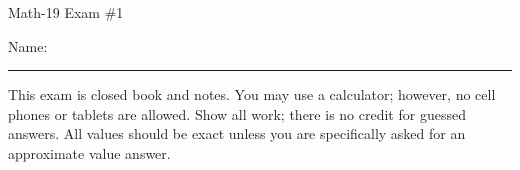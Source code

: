 \documentclass[letterpaper,12pt,fleqn]{article}
\begin{document}
\begin{center}
\Large Math-19 Exam \#1
\end{center}

\vspace{0.5in}

Name: \rule{4in}{1pt}

\vspace{0.5in}

This exam is closed book and notes. You may use a calculator; however, no cell
phones or tablets are allowed. Show all work; there is no credit for guessed
answers. All values should be exact unless you are specifically asked for an
approximate value answer.

\vspace{0.5in}

\newcommand{\fillin}{\rule{2in}{1pt}}
\newcommand{\sfillin}{\rule{0.5in}{1pt}}
\end{document}
